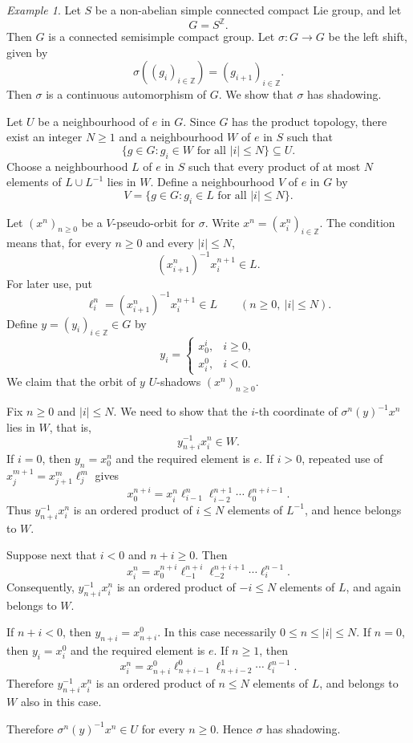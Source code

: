 \documentclass[12pt]{amsart}
\theoremstyle{definition}
\numberwithin{equation}{section}
\theoremstyle{remark}
\newtheorem{example}[theorem]{Example}
\begin{document}
\begin{example}\label{example}
	Let $S$ be a non-abelian simple connected compact Lie group, and let
	\[
	G=S^{\mathbb Z}.
	\]
	Then $G$ is a connected semisimple compact group.
	Let $\sigma:G\to G$ be the left shift, given by
	\[
	\sigma((g_i)_{i\in\mathbb Z})=(g_{i+1})_{i\in\mathbb Z}.
	\]
	Then $\sigma$ is a continuous automorphism of $G$. We show that $\sigma$
	has shadowing.
	
	Let $U$ be a neighbourhood of $e$ in $G$. Since $G$ has the product
	topology, there exist an integer $N\geq 1$ and a neighbourhood $W$ of $e$
	in $S$ such that
	\[
	\{g\in G:g_i\in W\text{ for all }|i|\leq N\}\subseteq U.
	\]
	Choose a neighbourhood $L$ of $e$ in $S$ such that every product of at most
	$N$ elements of $L\cup L^{-1}$ lies in $W$. Define a neighbourhood $V$ of
	$e$ in $G$ by
	\[
	V=\{g\in G:g_i\in L\text{ for all }|i|\leq N\}.
	\]
	
	Let $(x^n)_{n\geq 0}$ be a $V$-pseudo-orbit for $\sigma$. Write
	$x^n=(x^n_i)_{i\in\mathbb Z}$. The condition means that, for every
	$n\geq 0$ and every $|i|\leq N$,
	\[
	(x^n_{i+1})^{-1}x^{n+1}_i\in L.
	\]
	For later use, put
	\[
	\ell^n_i=(x^n_{i+1})^{-1}x^{n+1}_i\in L
	\qquad(n\geq0,\ |i|\leq N).
	\]
	Define $y=(y_i)_{i\in\mathbb Z}\in G$ by
	\[
	y_i=
	\begin{cases}
		x^i_0, & i\geq 0,\\
		x^0_i, & i<0.
	\end{cases}
	\]
	We claim that the orbit of $y$ $U$-shadows $(x^n)_{n\geq 0}$.
	
	Fix $n\geq 0$ and $|i|\leq N$. We need to show that the $i$-th coordinate
	of $\sigma^n(y)^{-1}x^n$ lies in $W$, that is,
	\[
	y_{n+i}^{-1}x^n_i\in W.
	\]
	If $i=0$, then $y_n=x^n_0$ and the required element is $e$. If $i>0$,
	repeated use of
	$x^{m+1}_j=x^m_{j+1}\ell^m_j$ gives
	\[
	x^{n+i}_0
	=x^n_i\ell^n_{i-1}\ell^{n+1}_{i-2}\cdots\ell^{n+i-1}_0.
	\]
	Thus $y_{n+i}^{-1}x^n_i$ is an ordered product of $i\leq N$ elements
	of $L^{-1}$, and hence belongs to $W$.

	Suppose next that $i<0$ and $n+i\geq0$. Then
	\[
	x^n_i
	=x^{n+i}_0\ell^{n+i}_{-1}\ell^{n+i+1}_{-2}\cdots
	\ell^{n-1}_i.
	\]
	Consequently, $y_{n+i}^{-1}x^n_i$ is an ordered product of
	$-i\leq N$ elements of $L$, and again belongs to $W$.

	If $n+i<0$, then $y_{n+i}=x^0_{n+i}$. In this case necessarily
	$0\leq n\leq |i|\leq N$. If $n=0$, then $y_i=x_i^0$ and the required
	element is $e$. If $n\geq1$, then
	\[
	x^n_i
	=x^0_{n+i}\ell^0_{n+i-1}\ell^1_{n+i-2}\cdots\ell^{n-1}_i.
	\]
	Therefore $y_{n+i}^{-1}x^n_i$ is an ordered product of $n\leq N$
	elements of $L$, and belongs to $W$ also in this case.
	
	Therefore $\sigma^n(y)^{-1}x^n\in U$ for every $n\geq 0$. Hence $\sigma$
	has shadowing.
\end{example}
\end{document}
